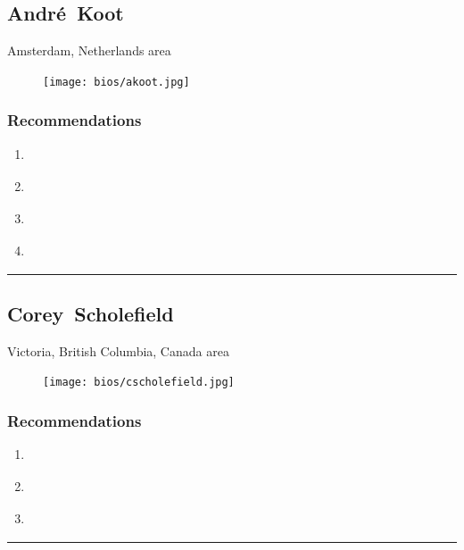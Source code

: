 \subsection{André~Koot} \textsf{Amsterdam, Netherlands area} \par \setlength{\columnsep}{0pt} \begin{figure} \centering \texttt{[image: bios/akoot.jpg]} \end{figure}  \subsubsection{Recommendations}\begin{enumerate}
\item \cite{Cameron2005}
\item \cite{Hardt2005}
\item \cite{Harper2006}
\item \cite{Williamson2017}
\end{enumerate}\noindent\rule{\textwidth}{0.2pt}

\subsection{Corey~Scholefield} \textsf{Victoria, British Columbia, Canada area} \par \setlength{\columnsep}{0pt} \begin{figure} \centering \texttt{[image: bios/cscholefield.jpg]} \end{figure}  \subsubsection{Recommendations}\begin{enumerate}
\item \cite{Hazelton2015}
\item \cite{Prasad2012}
\item \cite{Windley2005}
\end{enumerate}\noindent\rule{\textwidth}{0.2pt}

